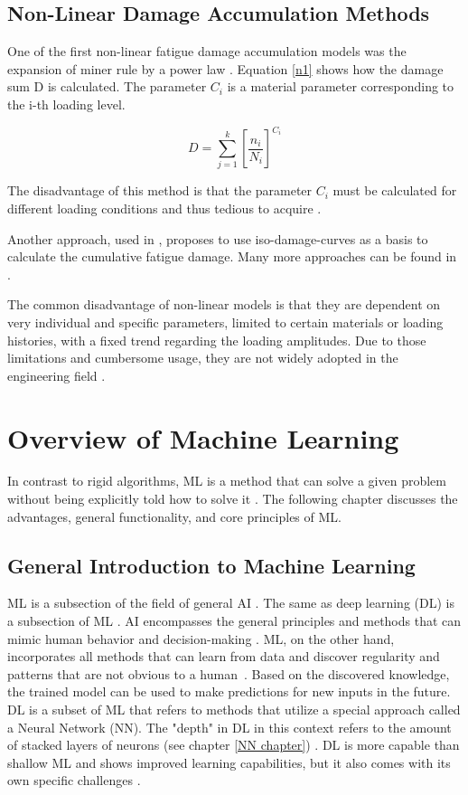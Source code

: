 \subsection{Non-Linear Damage Accumulation Methods}
One of the first non-linear fatigue damage accumulation models was the expansion of miner rule by a power law \cite{Zuo}.
Equation \ref{n1} shows how the damage sum D is calculated. The parameter \(C_i\) is a material parameter corresponding to the i-th loading level. 

\begin{equation}\label{n1}
	D = \sum_{j=1}^{k}\left [\frac{n_i}{N_i}\right ]^{{C_i}}
\end{equation}

The disadvantage of this method is that the parameter \(C_i\) must be calculated for different loading
conditions and thus tedious to acquire \cite{Zuo}.

Another approach, used in \cite{Rege}, proposes to use iso-damage-curves as a basis to calculate the cumulative fatigue damage.\newline
Many more approaches can be found in \cite{Zhu1,Gao,Lv,Chen}.

The common disadvantage of non-linear models is that they are dependent on very individual and specific parameters, limited to certain materials or loading histories, with a fixed trend regarding the loading amplitudes. Due to those limitations and cumbersome usage, they are not widely adopted in the engineering field \cite{Vietze}. 


\newpage
\section{Overview of Machine Learning}
In contrast to rigid algorithms, ML is a method that can solve a given problem without being explicitly told how to solve it \cite{Sutton,Janiesch}. The following chapter discusses the advantages, general functionality, and core principles of ML.

\subsection{General Introduction to Machine Learning}\label{General Introduction to Machine Learning}
ML is a subsection of the field of general AI \cite{Helm}. The same as deep learning (DL) is a subsection of ML \cite{LeCun}.
AI encompasses the general principles and methods that can mimic human behavior and decision-making \cite{Janiesch}. ML, on the other hand, incorporates all methods that can learn from data and discover regularity and patterns that are not obvious to a human~\cite{Theodoridis}. Based on the discovered knowledge, the trained model can be used to make predictions for new inputs in the future.
DL is a subset of ML that refers to methods that utilize a special approach called a Neural Network (NN). The "depth" in DL in this context refers to the amount of stacked layers of neurons (see chapter \ref{NN chapter}) \cite{Carleo}. 
DL is more capable than shallow ML and shows improved learning capabilities, but it also comes with its own specific challenges \cite{Janiesch, LeCun}.

